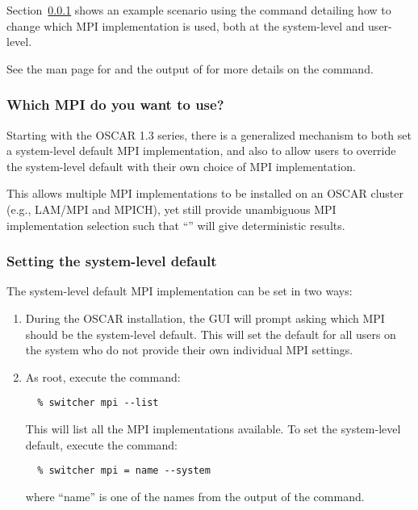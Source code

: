 Section~\ref{app:switcher-which-mpi-to-use} shows an example scenario
using the  command detailing how to change which MPI
implementation is used, both at the system-level and user-level.

See the man page for  and the output of  for more details on the  command.


\subsubsection{Which MPI do you want to use?}
\label{app:switcher-which-mpi-to-use}

Starting with the OSCAR 1.3 series, there is a generalized mechanism
to both set a system-level default MPI implementation, and also to
allow users to override the system-level default with their own choice
of MPI implementation.

This allows multiple MPI implementations to be installed on an OSCAR
cluster (e.g., LAM/MPI and MPICH), yet still provide unambiguous MPI
implementation selection such that ``'' will
give deterministic results.

\subsubsection{Setting the system-level default}

The system-level default MPI implementation can be set in two ways:

\begin{enumerate}
\item During the OSCAR installation, the GUI will prompt asking which
  MPI should be the system-level default.  This will set the default
  for all users on the system who do not provide their own individual
  MPI settings.

\item As root, execute the command:

\begin{verbatim}
  % switcher mpi --list
\end{verbatim}

   This will list all the MPI implementations available.  To set the
   system-level default, execute the command:

\begin{verbatim}
  % switcher mpi = name --system
\end{verbatim}
   
   where ``name'' is one of the names from the output of the
    command.
\end{enumerate}

